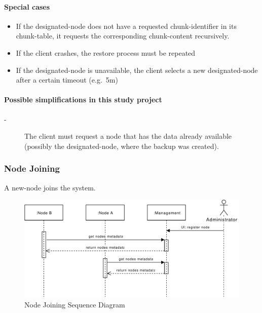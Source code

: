 \paragraph{Special cases}
\begin{itemize}
    \item If the \gls{designated-node} does not have a requested \gls{chunk-identifier} in its \gls{chunk-table}, it requests the corresponding \gls{chunk-content} recursively.
    \item If the \gls{client} crashes, the restore process must be repeated
    \item If the \gls{designated-node} is unavailable, the \gls{client} selects a new \gls{designated-node} after a certain timeout (e.g.\ 5m)
\end{itemize}

\paragraph{Possible simplifications in this study project}
\begin{description}
    \item[-] The \gls{client} must request a \gls{node} that has the data already available (possibly the \gls{designated-node}, where the backup was created).
\end{description}


\subsubsection{Node Joining}\label{sec:scenario-node-join}
A \gls{new-node} joins the \gls{system}.

\begin{figure}[h]
    \centering
    \includegraphics[width=\linewidth]{resources/node_joining.pdf}
    \caption{Node Joining Sequence Diagram}
    \label{fig:node-joining}
\end{figure}

